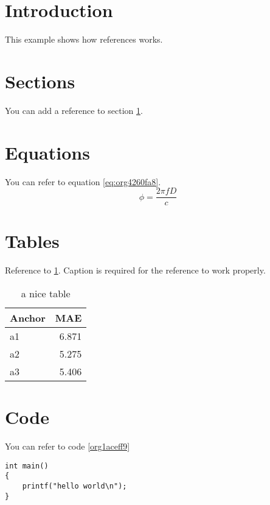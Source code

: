 


\section{Introduction}
\label{sec:orgdab4e67}
This example shows how references works.

\section{Sections}
\label{sec:orga51eb59}
You can add a reference to section \ref{sec:orgdab4e67}.

\section{Equations}
\label{sec:orgbb2ac28}
You can refer to equation \ref{eq:org4260fa8}.
\begin{equation}
\label{eq:org4260fa8}
\phi = \frac{2\pi fD}{c}
\end{equation}

\section{Tables}
\label{sec:org943a34b}
Reference to \ref{tab:org1f2c32b}.
Caption is required for the reference to work properly.

\begin{table}[htbp]
\caption{\label{tab:org1f2c32b}
a nice table}
\centering
\begin{tabular}{lr}
Anchor & MAE\\
\hline
a1 & 6.871\\
a2 & 5.275\\
a3 & 5.406\\
\end{tabular}
\end{table}

\section{Code}
\label{sec:org2752938}
You can refer to code \ref{org1aceff9}

\begin{verbatim}
int main()
{
    printf("hello world\n");
}
\end{verbatim}


